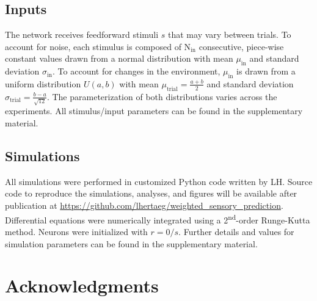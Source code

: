 \documentclass[10pt,a4paper,draft]{article}
\begin{document}
\subsection*{Inputs}
%
The network receives feedforward stimuli $s$ that may vary between trials. To account for noise, each stimulus is composed of N$_\mathrm{in}$ consecutive, piece-wise constant values drawn from a normal distribution with mean $\mu_\mathrm{in}$ and standard deviation $\sigma_\mathrm{in}$. To account for changes in the environment, $\mu_\mathrm{in}$ is drawn from a uniform distribution $U(a,b)$ with mean $\mu_\mathrm{trial} = \frac{a+b}{2}$ and standard deviation $\sigma_\mathrm{trial} = \frac{b-a}{\sqrt{12}}$. The parameterization of both distributions varies across the experiments. All stimulus/input parameters can be found in the supplementary material.

\subsection*{Simulations}
%
All simulations were performed in customized Python code written by LH. Source code to reproduce the simulations, analyses, and figures will be available after publication at \url{https://github.com/lhertaeg/weighted_sensory_prediction}. Differential equations were numerically integrated using a 2\textsuperscript{nd}-order Runge-Kutta method. Neurons were initialized with $r=0/s$. Further details and values for simulation parameters can be found in the supplementary material.


\section*{Acknowledgments}
%







\clearpage
\appendix
\end{document}
